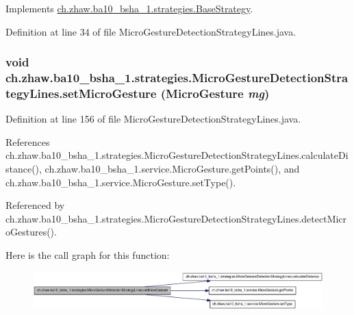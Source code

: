 Implements \hyperlink{classch_1_1zhaw_1_1ba10__bsha__1_1_1strategies_1_1BaseStrategy_af6ea27835befac71906915236a347450}{ch.zhaw.ba10\_\-bsha\_\-1.strategies.BaseStrategy}.

Definition at line 34 of file MicroGestureDetectionStrategyLines.java.\hypertarget{classch_1_1zhaw_1_1ba10__bsha__1_1_1strategies_1_1MicroGestureDetectionStrategyLines_ae2fe4b45825de8b32bd93848a6ecac12}{
\subsubsection[{setMicroGesture}]{\setlength{\rightskip}{0pt plus 5cm}void ch.zhaw.ba10\_\-bsha\_\-1.strategies.MicroGestureDetectionStrategyLines.setMicroGesture ({\bf MicroGesture} {\em mg})}}
\label{classch_1_1zhaw_1_1ba10__bsha__1_1_1strategies_1_1MicroGestureDetectionStrategyLines_ae2fe4b45825de8b32bd93848a6ecac12}


Definition at line 156 of file MicroGestureDetectionStrategyLines.java.

References ch.zhaw.ba10\_\-bsha\_\-1.strategies.MicroGestureDetectionStrategyLines.calculateDistance(), ch.zhaw.ba10\_\-bsha\_\-1.service.MicroGesture.getPoints(), and ch.zhaw.ba10\_\-bsha\_\-1.service.MicroGesture.setType().

Referenced by ch.zhaw.ba10\_\-bsha\_\-1.strategies.MicroGestureDetectionStrategyLines.detectMicroGestures().

Here is the call graph for this function:\nopagebreak
\begin{figure}[H]
\begin{center}
\leavevmode
\includegraphics[width=420pt]{classch_1_1zhaw_1_1ba10__bsha__1_1_1strategies_1_1MicroGestureDetectionStrategyLines_ae2fe4b45825de8b32bd93848a6ecac12_cgraph}
\end{center}
\end{figure}


